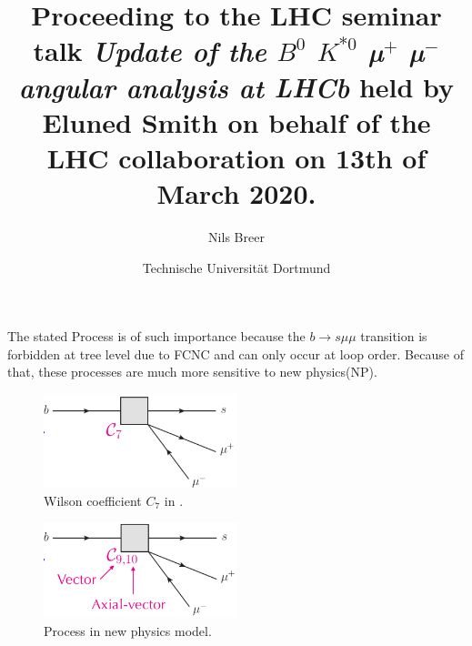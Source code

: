 


\setlength{\oddsidemargin}{0.0 cm}
\setlength{\evensidemargin}{0.0 cm}
\setlength{\topmargin}{-1cm}
\setlength{\textheight}{24 cm}
\setlength{\textwidth}{16 cm}

\pagestyle{plain}

\setlength{\parindent}{0in}



\author{Nils Breer}
\date{Technische Universit\"at Dortmund}

\title{Proceeding to the LHC seminar talk \textit{Update of the $B^0$ \to $K^{*0}$ µ$^{+}$ µ$^{-}$ angular analysis at LHCb} held by Eluned Smith on behalf of the LHC collaboration on 13th of March 2020.}

\maketitle


The stated Process is of such importance because the
$b \to s \mu \mu$ transition is forbidden at tree level due to FCNC and can only occur at loop order.
Because of that, these processes are much more sensitive to new physics(NP).

\begin{figure}[htb]
  \centering
  \includegraphics[width=0.5\textwidth]{flavor_plots/wilson_c7.png}
  \caption{Wilson coefficient $C_7$ in .}
  \label{fig:sm_process}
\end{figure}

\begin{figure}[htb]
  \centering
  \includegraphics[width=0.5\textwidth]{flavor_plots/wilson_c9_c10.png}
  \caption{Process in new physics model.}
  \label{fig:np_process}
\end{figure}

